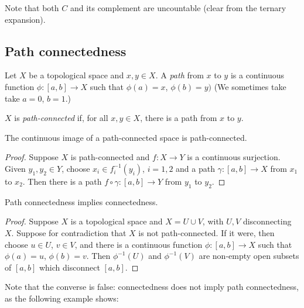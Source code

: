 Note that both $C$ and its complement are uncountable (clear from the ternary expansion).



\subsection{Path connectedness} %
\label{sub:path_connectedness}

\begin{definition}
	Let $X$ be a topological space and $x,y\in X$. A \emph{path} from $x$ to $y$ is a continuous function $\phi:[a,b]\to X$ such that $\phi(a)=x$, $\phi(b)=y)$ (We sometimes take take $a=0$, $b=1$.)
	
	$X$ is \emph{path-connected} if, for all $x,y\in X$, there is a path from $x$ to $y$.
\end{definition}

\begin{proposition}
	The continuous image of a path-connected space is path-connected.
\end{proposition}

\begin{proof}
	Suppose $X$ is path-connected and $f:X\to Y$ is a continuous surjection. Given $y_1,y_2\in Y$, choose $x_i\in f^{-1}_i(y_i)$, $i=1,2$ and a path $\gamma:[a,b]\to X$ from $x_1$ to $x_2$. Then there is a path $f\circ\gamma:[a,b]\to Y$ from $y_1$ to $y_2$.
\end{proof}

\begin{proposition}
	Path connectedness implies connectedness. \label{prop:path-connected-implies}
\end{proposition}

\begin{proof}
	Suppose $X$ is a topological space and $X=U\cup V$, with $U, V$ disconnecting $X$. Suppose for contradiction that $X$ is not path-connected. If it were, then choose $u\in U$, $v\in V$, and there is a continuous function $\phi:[a,b]\to X$ such that $\phi(a)=u$, $\phi(b)=v$. Then $\phi^{-1}(U)$ and $\phi^{-1}(V)$ are non-empty open subsets of $[a,b]$ which disconnect $[a,b]$.
\end{proof}

Note that the converse is false: connectedness does not imply path connectedness, as the following example shows:

